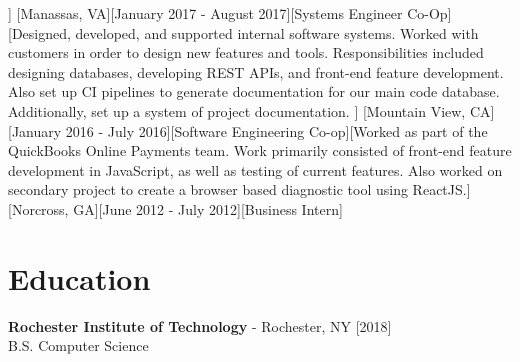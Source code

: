 \documentclass[showluaboxes=false]{resume}
\begin{document}
%
		]%
		[Manassas, VA][January 2017 - August 2017][Systems Engineer Co-Op][Designed, developed, and supported internal software systems. Worked with customers in order to design new features and tools. Responsibilities included designing databases, developing REST APIs, and front-end feature development. Also set up CI pipelines to generate documentation for our main code database. Additionally, set up a system of project documentation.%
		]%
%
		[Mountain View, CA][January 2016 - July 2016][Software Engineering Co-op][Worked as part of the QuickBooks Online Payments team. Work primarily consisted of front-end feature development in JavaScript, as well as testing of current features. Also worked on secondary project to create a browser based diagnostic tool using ReactJS.]%
		[Norcross, GA][June 2012 - July 2012][Business Intern]%

		\section{Education}%
		\textbf{Rochester Institute of Technology}
		- {\small Rochester, NY}
		\hfill{}
		\\
		\begingroup
		\setlength{\parindent}{0.4in}
		\indent B.S. Computer Science
		\endgroup
		\vspace*{0.25\baselineskip}%
	
\end{document}
